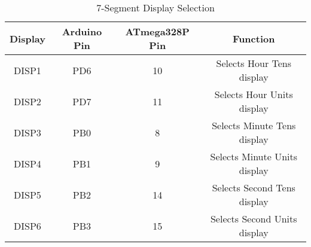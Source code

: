 \begin{table}[h]
    \centering
    \begin{tabular}{|c|c|c|c|}
        \hline
        \textbf{Display} & \textbf{Arduino Pin} & \textbf{ATmega328P Pin} & \textbf{Function} \\
        \hline
        DISP1 & PD6 & 10 & Selects Hour Tens display \\
        DISP2 & PD7 & 11 & Selects Hour Units display \\
        DISP3 & PB0 & 8  & Selects Minute Tens display \\
        DISP4 & PB1 & 9  & Selects Minute Units display \\
        DISP5 & PB2 & 14 & Selects Second Tens display \\
        DISP6 & PB3 & 15 & Selects Second Units display \\
        \hline
    \end{tabular}
    \caption{7-Segment Display Selection}
    \label{tab:display_selection}
\end{table}